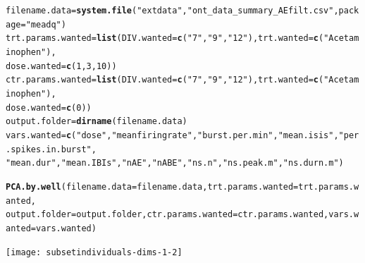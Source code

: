 \documentclass{article}\usepackage[]{graphicx}\usepackage[]{color}
\makeatletter
\newcommand{\hlnum}[1]{\textcolor[rgb]{0.686,0.059,0.569}{#1}}%
\newcommand{\hlstr}[1]{\textcolor[rgb]{0.192,0.494,0.8}{#1}}%
\newcommand{\hlstd}[1]{\textcolor[rgb]{0.345,0.345,0.345}{#1}}%
\newcommand{\hlkwb}[1]{\textcolor[rgb]{0.69,0.353,0.396}{#1}}%
\newcommand{\hlkwc}[1]{\textcolor[rgb]{0.333,0.667,0.333}{#1}}%
\newcommand{\hlkwd}[1]{\textcolor[rgb]{0.737,0.353,0.396}{\textbf{#1}}}%
\newenvironment{kframe}{%
 \def\at@end@of@kframe{}%
 \ifinner\ifhmode%
  \def\at@end@of@kframe{\end{minipage}}%
  \begin{minipage}{\columnwidth}%
 \fi\fi%
 \def\FrameCommand##1{\hskip\@totalleftmargin \hskip-\fboxsep
 \colorbox{shadecolor}{##1}\hskip-\fboxsep
     \hskip-\linewidth \hskip-\@totalleftmargin \hskip\columnwidth}%
 \MakeFramed {\advance\hsize-\width
   \@totalleftmargin\z@ \linewidth\hsize
   \@setminipage}}%
 {\par\unskip\endMakeFramed%
 \at@end@of@kframe}
\newenvironment{knitrout}{}{} %
\makeatother
\begin{document}
\begin{knitrout}
\color{fgcolor}\begin{kframe}
\begin{alltt}
\hlstd{filename.data} \hlkwb{=} \hlkwd{system.file}\hlstd{(}\hlstr{"extdata"}\hlstd{,} \hlstr{"ont_data_summary_AEfilt.csv"}\hlstd{,} \hlkwc{package} \hlstd{=} \hlstr{"meadq"}\hlstd{)}
\hlstd{trt.params.wanted} \hlkwb{=} \hlkwd{list}\hlstd{(}\hlkwc{DIV.wanted} \hlstd{=} \hlkwd{c}\hlstd{(}\hlstr{"7"}\hlstd{,} \hlstr{"9"}\hlstd{,} \hlstr{"12"}\hlstd{),} \hlkwc{trt.wanted} \hlstd{=} \hlkwd{c}\hlstd{(}\hlstr{"Acetaminophen"}\hlstd{),}
    \hlkwc{dose.wanted} \hlstd{=} \hlkwd{c}\hlstd{(}\hlnum{1}\hlstd{,} \hlnum{3}\hlstd{,} \hlnum{10}\hlstd{))}
\hlstd{ctr.params.wanted} \hlkwb{=} \hlkwd{list}\hlstd{(}\hlkwc{DIV.wanted} \hlstd{=} \hlkwd{c}\hlstd{(}\hlstr{"7"}\hlstd{,} \hlstr{"9"}\hlstd{,} \hlstr{"12"}\hlstd{),} \hlkwc{trt.wanted} \hlstd{=} \hlkwd{c}\hlstd{(}\hlstr{"Acetaminophen"}\hlstd{),}
    \hlkwc{dose.wanted} \hlstd{=} \hlkwd{c}\hlstd{(}\hlnum{0}\hlstd{))}
\hlstd{output.folder} \hlkwb{=} \hlkwd{dirname}\hlstd{(filename.data)}
\hlstd{vars.wanted} \hlkwb{=} \hlkwd{c}\hlstd{(}\hlstr{"dose"}\hlstd{,} \hlstr{"meanfiringrate"}\hlstd{,} \hlstr{"burst.per.min"}\hlstd{,} \hlstr{"mean.isis"}\hlstd{,} \hlstr{"per.spikes.in.burst"}\hlstd{,}
    \hlstr{"mean.dur"}\hlstd{,} \hlstr{"mean.IBIs"}\hlstd{,} \hlstr{"nAE"}\hlstd{,} \hlstr{"nABE"}\hlstd{,} \hlstr{"ns.n"}\hlstd{,} \hlstr{"ns.peak.m"}\hlstd{,} \hlstr{"ns.durn.m"}\hlstd{)}

\hlkwd{PCA.by.well}\hlstd{(}\hlkwc{filename.data} \hlstd{= filename.data,} \hlkwc{trt.params.wanted} \hlstd{= trt.params.wanted,}
    \hlkwc{output.folder} \hlstd{= output.folder,} \hlkwc{ctr.params.wanted} \hlstd{= ctr.params.wanted,} \hlkwc{vars.wanted} \hlstd{= vars.wanted)}
\end{alltt}
\end{kframe}
\end{knitrout}




\begin{knitrout}
\color{fgcolor}\begin{kframe}


{\ttfamily\noindent\bfseries{}}\end{kframe}
\end{knitrout}

\graphicspath{ {./} }
\texttt{[image: subsetindividuals-dims-1-2]}
\end{document}
